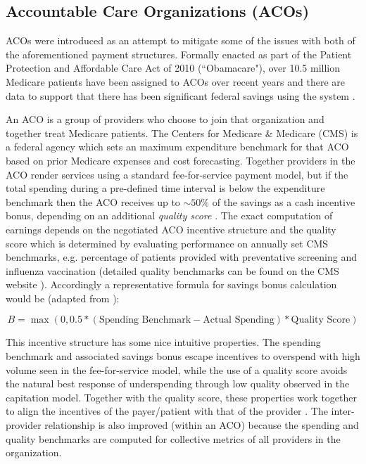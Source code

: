 \documentclass{article}
\begin{document}
\subsection{Accountable Care Organizations (ACOs)} \label{sec:aco}
ACOs were introduced as an attempt to mitigate some of the issues with both of the aforementioned payment structures. Formally enacted as part of the Patient Protection and Affordable Care Act of 2010 (``Obamacare"), over 10.5 million Medicare patients have been assigned to ACOs over recent years and there are data to support that there has been significant federal savings using the system \cite{acos}.

An ACO is a group of providers who choose to join that organization and together treat Medicare patients. The Centers for Medicare \& Medicare (CMS) is a federal agency which sets an maximum expenditure benchmark for that ACO based on prior Medicare expenses and cost forecasting. Together providers in the ACO render services using a standard fee-for-service payment model, but if the total spending during a pre-defined time interval is below the expenditure benchmark then the ACO receives up to ${\sim}50$\% of the savings as a cash incentive bonus, depending on an additional \emph{quality score} \cite{acos}. The exact computation of earnings depends on the negotiated ACO incentive structure and the quality score which is determined by evaluating performance on annually set CMS benchmarks, e.g. percentage of patients provided with preventative screening and influenza vaccination (detailed quality benchmarks can be found on the CMS website \cite{cms}). Accordingly a representative formula for savings bonus calculation would be (adapted from \cite{acos}):

\begin{equation}
    B = \max (0, 0.5 * (\text{Spending Benchmark} - \text{Actual Spending}) * \text{Quality Score})
\end{equation}

This incentive structure has some nice intuitive properties. The spending benchmark and associated savings bonus escape incentives to overspend with high volume seen in the fee-for-service model, while the use of a quality score avoids the natural best response of underspending through low quality observed in the capitation model. Together with the quality score, these properties work together to align the incentives of the payer/patient with that of the provider \cite{acoecon}. The inter-provider relationship is also improved (within an ACO) because the spending and quality benchmarks are computed for collective metrics of all providers in the organization.
\end{document}
